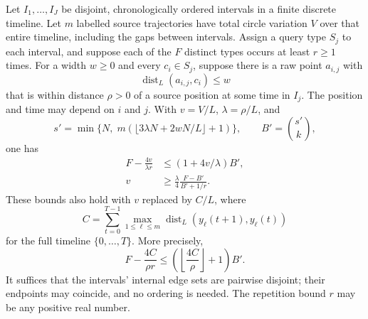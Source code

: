 \begin{corollary}
\label{cor:movement-interval}
Let $I_1,\ldots,I_J$ be disjoint, chronologically ordered intervals in a
finite discrete timeline.  Let $m$ labelled source trajectories have
total circle variation $V$ over that entire timeline, including the
gaps between intervals.  Assign a query type $S_j$ to each interval,
and suppose each of the $F$ distinct types occurs at least $r\ge1$
times.  For a width $w\ge0$ and every $c_i\in S_j$, suppose there is a raw point $a_{i,j}$
with
\[
 \operatorname{dist}_L(a_{i,j},c_i)\le w
\]
that is within distance $\rho>0$ of a source position at some time in
$I_j$.  The position and time may depend on $i$ and $j$.  With
$v=V/L$, $\lambda=\rho/L$, and
\[
 s'=\min\{N,\;m(\lfloor3\lambda N+2wN/L\rfloor+1)\},
 \qquad B'=\binom{s'}k,
\]
one has
\begin{align}
 F-\frac{4v}{\lambda r}&\le(1+4v/\lambda)B',
   \label{eq:movement-interval-count}\\
 v&\ge\frac{\lambda}{4}\frac{F-B'}{B'+1/r}.
   \label{eq:movement-interval-lower}
\end{align}
These bounds also hold with $v$ replaced by $C/L$, where
\[
 C=\sum_{t=0}^{T-1}\max_{1\le\ell\le m}
       \operatorname{dist}_L(y_\ell(t+1),y_\ell(t))
\]
for the full timeline $\{0,\ldots,T\}$.  More precisely,
\[
 F-\frac{4C}{\rho r}
 \le\left(\left\lfloor\frac{4C}{\rho}\right\rfloor+1\right)B'.
\]
It suffices that the intervals' internal edge sets are pairwise disjoint;
their endpoints may coincide, and no ordering is needed.  The repetition
bound $r$ may be any positive real number.
\end{corollary}

